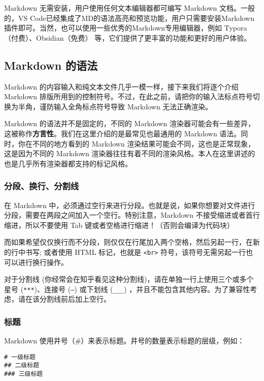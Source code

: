 \documentclass[../main.tex]{subfiles}
\begin{document}
Markdown 无需安装，用户使用任何文本编辑器都可编写 Markdown 文档。一般的，VS Code已经集成了MD的语法高亮和预览功能，用户只需要安装Markdown插件即可。当然，也可以使用一些优秀的Markdown专用编辑器，例如 Typora（付费）、Obsidian（免费） 等，它们提供了更丰富的功能和更好的用户体验。

\subsection{Markdown 的语法}

Markdown 的内容输入和纯文本文件几乎一模一样，接下来我们将逐个介绍 Markdown 排版所用到的控制符号。不过，在此之前，请把你的输入法标点符号切换为半角，谨防输入全角标点符号导致 Markdown 无法正确渲染。

\begin{note}
  Markdown 的语法并不是固定的，不同的 Markdown 渲染器可能会有一些差异，这被称作\textbf{方言性}。我们在这里介绍的是最常见也最通用的 Markdown 语法。同时，你在不同的地方看到的 Markdown 渲染结果可能会不同，这也是正常现象，这是因为不同的 Markdown 渲染器往往有着不同的渲染风格。本人在这里讲述的也是几乎所有渲染器都支持的标记风格。
\end{note}

\subsubsection{分段、换行、分割线}

在 Markdown 中，必须通过空行来进行分段。也就是说，如果你想要对文件进行分段，需要在两段之间加入一个空行。特别注意，Markdown 不接受缩进或者首行缩进，所以不要使用 Tab 键或者空格进行缩进！（否则会编译为代码块）

而如果希望仅仅换行而不分段，则仅仅在行尾加入两个空格，然后另起一行，在新的行中书写; 或者使用 HTML 标记，也就是 \texttt{<br>} 符号，该符号无需另起一行也可以进行换行操作。

对于分割线 (你经常会在知乎看见这种分割线)，请在单独一行上使用三个或多个星号 (\texttt{***})、连接号 (\texttt{---}) 或下划线 (\texttt{\_\_\_}) ，并且不能包含其他内容。为了兼容性考虑，请在该分割线前后加上空行。

\subsubsection{标题}

Markdown 使用井号（\#）来表示标题。井号的数量表示标题的层级，例如：

\begin{lstlisting}
# 一级标题
## 二级标题
### 三级标题
\end{lstlisting}
\end{document}
